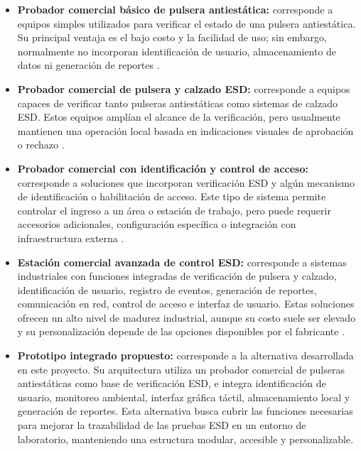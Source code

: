 \begin{itemize}
    \item \textbf{Probador comercial básico de pulsera antiestática:} corresponde a
    equipos simples utilizados para verificar el estado de una pulsera antiestática. Su
    principal ventaja es el bajo costo y la facilidad de uso; sin embargo, normalmente no
    incorporan identificación de usuario, almacenamiento de datos ni generación de
    reportes \cite{Desco_19240}.

    \item \textbf{Probador comercial de pulsera y calzado ESD:} corresponde a equipos
    capaces de verificar tanto pulseras antiestáticas como sistemas de calzado ESD. Estos
    equipos amplían el alcance de la verificación, pero usualmente mantienen una operación
    local basada en indicaciones visuales de aprobación o rechazo \cite{teknind_dual_esd_tester}.

    \item \textbf{Probador comercial con identificación y control de acceso:} corresponde
    a soluciones que incorporan verificación ESD y algún mecanismo de identificación o
    habilitación de acceso. Este tipo de sistema permite controlar el ingreso a un área o
    estación de trabajo, pero puede requerir accesorios adicionales, configuración
    específica o integración con infraestructura externa \cite{SCS_770758}.

    \item \textbf{Estación comercial avanzada de control ESD:} corresponde a sistemas
    industriales con funciones integradas de verificación de pulsera y calzado,
    identificación de usuario, registro de eventos, generación de reportes, comunicación
    en red, control de acceso e interfaz de usuario. Estas soluciones ofrecen un alto nivel
    de madurez industrial, aunque su costo suele ser elevado y su personalización depende
    de las opciones disponibles por el fabricante \cite{SmartLogPro2}.

    \item \textbf{Prototipo integrado propuesto:} corresponde a la alternativa desarrollada
    en este proyecto. Su arquitectura utiliza un probador comercial de pulseras
    antiestáticas como base de verificación ESD, e integra identificación de usuario,
    monitoreo ambiental, interfaz gráfica táctil, almacenamiento local y generación de
    reportes. Esta alternativa busca cubrir las funciones necesarias para mejorar la
    trazabilidad de las pruebas ESD en un entorno de laboratorio, manteniendo una
    estructura modular, accesible y personalizable.
\end{itemize}

